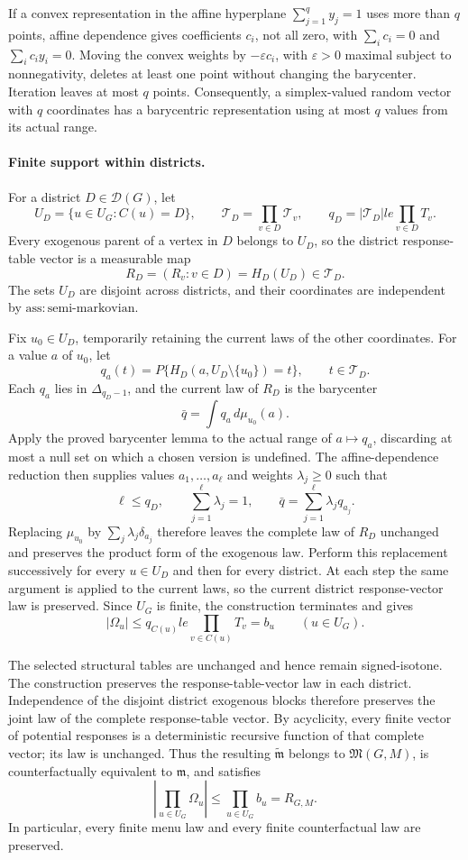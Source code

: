 If a convex representation in the affine hyperplane \(\sum_{j=1}^q y_j=1\) uses more than \(q\) points, affine dependence gives coefficients \(c_i\), not all zero, with \(\sum_i c_i=0\) and \(\sum_i c_i y_i=0\).  Moving the convex weights by \(-\varepsilon c_i\), with \(\varepsilon>0\) maximal subject to nonnegativity, deletes at least one point without changing the barycenter.  Iteration leaves at most \(q\) points.  Consequently, a simplex-valued random vector with \(q\) coordinates has a barycentric representation using at most \(q\) values from its actual range.

\paragraph{Finite support within districts.}
For a district \(D\in\mathcal D(G)\), let
\[
 U_D=\{u\in U_G:C(u)=D\},
 \qquad
 \mathcal T_D=\prod_{v\in D}\mathcal T_v,
 \qquad
 q_D=|\mathcal T_D|le\prod_{v\in D}T_v.
\]
Every exogenous parent of a vertex in \(D\) belongs to \(U_D\), so the district response-table vector is a measurable map
\[
 R_D=(R_v:v\in D)=H_D(U_D)\in\mathcal T_D.
\]
The sets \(U_D\) are disjoint across districts, and their coordinates are independent by \(\mathrm{ass:semi\text{-}markovian}\).

Fix \(u_0\in U_D\), temporarily retaining the current laws of the other coordinates.  For a value \(a\) of \(u_0\), let
\[
 q_a(t)=P\{H_D(a,U_D\setminus\{u_0\})=t\},
 \qquad t\in\mathcal T_D.
\]
Each \(q_a\) lies in \(\Delta_{q_D-1}\), and the current law of \(R_D\) is the barycenter
\[
 \bar q=\int q_a\,d\mu_{u_0}(a).
\]
Apply the proved barycenter lemma to the actual range of \(a\mapsto q_a\), discarding at most a null set on which a chosen version is undefined.  The affine-dependence reduction then supplies values \(a_1,\ldots,a_\ell\) and weights \(\lambda_j\ge0\) such that
\[
 \ell\le q_D,
 \qquad
 \sum_{j=1}^{\ell}\lambda_j=1,
 \qquad
 \bar q=\sum_{j=1}^{\ell}\lambda_jq_{a_j}.
\]
Replacing \(\mu_{u_0}\) by \(\sum_j\lambda_j\delta_{a_j}\) therefore leaves the complete law of \(R_D\) unchanged and preserves the product form of the exogenous law.  Perform this replacement successively for every \(u\in U_D\) and then for every district.  At each step the same argument is applied to the current laws, so the current district response-vector law is preserved.  Since \(U_G\) is finite, the construction terminates and gives
\[
 |\Omega_u|\le q_{C(u)}le\prod_{v\in C(u)}T_v=b_u
 \qquad (u\in U_G).
\]

The selected structural tables are unchanged and hence remain signed-isotone.  The construction preserves the response-table-vector law in each district.  Independence of the disjoint district exogenous blocks therefore preserves the joint law of the complete response-table vector.  By acyclicity, every finite vector of potential responses is a deterministic recursive function of that complete vector; its law is unchanged.  Thus the resulting \(\widetilde{\mathfrak m}\) belongs to \(\mathfrak M(G,M)\), is counterfactually equivalent to \(\mathfrak m\), and satisfies
\[
 \left|\prod_{u\in U_G}\Omega_u\right|
 \le\prod_{u\in U_G}b_u=R_{G,M}.
\]
In particular, every finite menu law and every finite counterfactual law are preserved.


